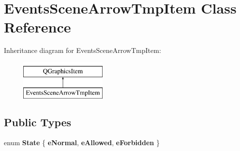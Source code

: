\hypertarget{class_events_scene_arrow_tmp_item}{\section{Events\-Scene\-Arrow\-Tmp\-Item Class Reference}
\label{class_events_scene_arrow_tmp_item}
}
Inheritance diagram for Events\-Scene\-Arrow\-Tmp\-Item\-:\begin{figure}[H]
\begin{center}
\leavevmode
\includegraphics[height=2.000000cm]{class_events_scene_arrow_tmp_item}
\end{center}
\end{figure}
\subsection*{Public Types}
\begin{DoxyCompactItemize}
\item 
enum {\bfseries State} \{ {\bfseries e\-Normal}, 
{\bfseries e\-Allowed}, 
{\bfseries e\-Forbidden}
 \}
\end{DoxyCompactItemize}
